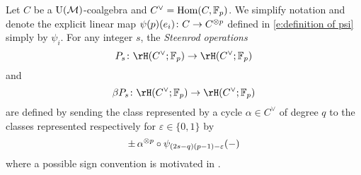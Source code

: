 Let $C$ be a ${\operatorname{U}(\mathcal{M})}$-coalgebra and $C^\vee = \mathrm{Hom}(C, {\mathbb{F}_p})$.
We simplify notation and denote the explicit linear map $\psi(p)(e_i) \colon C \to C^{\otimes p}$ defined in \eqref{e:definition of psi} simply by $\psi_i$.
For any integer $s$, the \textit{Steenrod operations}
\begin{equation*}
P_s \colon \rH(C^\vee; \Fp) \to \rH(C^\vee; \Fp)
\end{equation*}
and
\begin{equation*}
\beta P_s \colon \rH(C^\vee; \Fp) \to \rH(C^\vee; \Fp)
\end{equation*}
are defined by sending the class represented by a cycle $\alpha \in C^\vee$ of degree $q$ to the classes represented respectively for $\varepsilon \in \{0,1\}$ by
\begin{equation*}
\pm \, \alpha^{\otimes p} \circ \psi_{(2s-q)(p-1)-\varepsilon}(-)
\end{equation*}
where a possible sign convention is motivated in \cite[(6.1)]{steenrod1953cyclic}.

